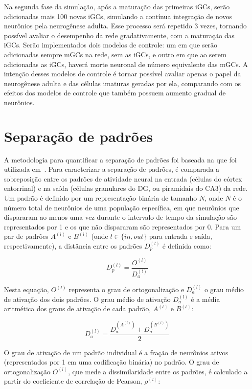 Na segunda fase da simulação, após a maturação das primeiras iGCs, serão adicionadas mais 100 novas iGCs, simulando a contínua
integração de novos neurônios pela neurogênese adulta. Esse processo será repetido 3 vezes, tornando possível avaliar o desempenho
da rede gradativamente, com a maturação das iGCs. Serão implementados dois modelos de controle: um em que serão adicionadas sempre
mGCs na rede, sem as iGCs, e outro em que ao serem adicionadas as iGCs, haverá morte neuronal de número equivalente das mGCs. A
intenção desses modelos de controle é tornar possível avaliar apenas o papel da neurogênese adulta e das células imaturas geradas
por ela, comparando com os efeitos dos modelos de controle que também possuem aumento gradual de neurônios.


\section{Separação de padrões}

A metodologia para quantificar a separação de padrões foi baseada na que foi utilizada em~\cite{kimEffect2024}.
Para caracterizar a separação de padrões, é comparada a sobreposição entre os padrões de atividade neural na entrada (células do
córtex entorrinal) e na saída (células granulares do DG, ou piramidais do CA3) da rede. Um padrão é definido por um
representação binária de tamanho $N$, onde $N$ é o número total de neurônios de uma população específica, em que neurônios que
dispararam ao menos uma vez durante o intervalo de tempo da simulação são representados por 1 e os que não dispararam são
representados por 0. Para um par de padrões $A^{(l)}$ e $B^{(l)}$ (onde $l \in \{in, out\}$ para entrada e saída,
respectivamente), a distância entre os padrões $D_p^{(l)}$ é definida como:

\begin{equation}
    \label{eq:dp}
    D_p^{(l)} = \frac{O^{(l)}}{D_a^{(l)}}
\end{equation}

Nesta equação, $O^{(l)}$ representa o grau de ortogonalização e $D_a^{(l)}$ o grau médio de ativação dos dois padrões. O grau médio de ativação $D_a^{(l)}$ é a média aritmética dos graus de ativação de cada padrão, $A^{(l)}$ e $B^{(l)}$:

\begin{equation}
    \label{eq:da}
    D_a^{(l)} = \frac{D_a^{(A^{(l)})} + D_a^{(B^{(l)})}}{2}
\end{equation}

O grau de ativação de um padrão individual é a fração de neurônios ativos (representados por 1 em uma codificação binária) no padrão.
O grau de ortogonalização $O^{(l)}$, que mede a dissimilaridade entre os padrões, é calculado a partir do coeficiente de correlação de Pearson, $\rho^{(l)}$:

